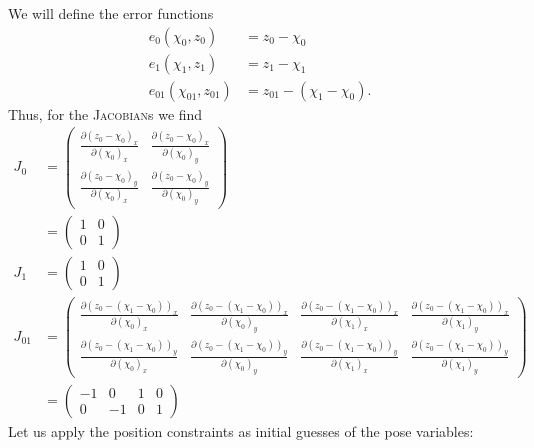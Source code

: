 We will define the error functions
\begin{align}
    e_0(\chi_0,z_0) &= z_0 - \chi_0 \\
    e_1(\chi_1,z_1) &= z_1 - \chi_1 \\
    e_{01}(\chi_{01},z_{01}) &= z_{01} - (\chi_1 - \chi_0).
\end{align}
Thus, for the \textsc{Jacobian}s we find
\begin{align}
    J_0 &= \begin{pmatrix}
               \frac{\partial (z_0 - \chi_0)_x}{\partial (\chi_0)_x} & \frac{\partial (z_0 - \chi_0)_x}{\partial (\chi_0)_y} \\
               \frac{\partial (z_0 - \chi_0)_y}{\partial (\chi_0)_x} & \frac{\partial (z_0 - \chi_0)_y}{\partial (\chi_0)_y}
    \end{pmatrix}\\
    &= \begin{pmatrix}
           1 & 0 \\ 0 & 1
    \end{pmatrix}\\
    J_1 &= \begin{pmatrix}
               1 & 0 \\ 0 & 1
    \end{pmatrix}\\
    J_{01} &= \begin{pmatrix}
                  \frac{\partial (z_0 - (\chi_1 - \chi_0))_x}{\partial (\chi_0)_x} &
                  \frac{\partial (z_0 - (\chi_1 - \chi_0))_x}{\partial (\chi_0)_y} &
                  \frac{\partial (z_0 - (\chi_1 - \chi_0))_x}{\partial (\chi_1)_x} &
                  \frac{\partial (z_0 - (\chi_1 - \chi_0))_x}{\partial (\chi_1)_y} \\
                  \frac{\partial (z_0 - (\chi_1 - \chi_0))_y}{\partial (\chi_0)_x} &
                  \frac{\partial (z_0 - (\chi_1 - \chi_0))_y}{\partial (\chi_0)_y} &
                  \frac{\partial (z_0 - (\chi_1 - \chi_0))_y}{\partial (\chi_1)_x} &
                  \frac{\partial (z_0 - (\chi_1 - \chi_0))_y}{\partial (\chi_1)_y}
    \end{pmatrix}\\
    &= \begin{pmatrix}
           -1 & 0 & 1 & 0 \\ 0 & -1 & 0 & 1
    \end{pmatrix}
\end{align}
Let us apply the position constraints as initial guesses of the pose variables:
